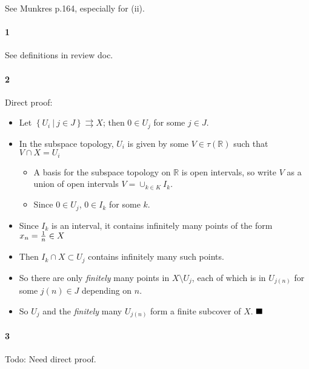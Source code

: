 \begin{solution}

\hfill

\begin{concept}

\hfill

See Munkres p.164, especially for (ii).

\end{concept}

\hypertarget{section-3}{%
\paragraph{1}\label{section-3}}

See definitions in review doc.

\hypertarget{section-4}{%
\paragraph{2}\label{section-4}}

Direct proof:

\begin{itemize}
\tightlist
\item
  Let
  \(\left\{{U_i {~\mathrel{\Big|}~}j\in J}\right\}\rightrightarrows X\);
  then \(0\in U_j\) for some \(j\in J\).
\item
  In the subspace topology, \(U_i\) is given by some
  \(V\in \tau({\mathbb{R}})\) such that \(V\cap X = U_i\)

  \begin{itemize}
  \tightlist
  \item
    A basis for the subspace topology on \({\mathbb{R}}\) is open
    intervals, so write \(V\) as a union of open intervals
    \(V = \cup_{k\in K} I_k\).
  \item
    Since \(0\in U_j\), \(0\in I_k\) for some \(k\).
  \end{itemize}
\item
  Since \(I_k\) is an interval, it contains infinitely many points of
  the form \(x_n = {1 \over n} \in X\)
\item
  Then \(I_k \cap X \subset U_j\) contains infinitely many such points.
\item
  So there are only \emph{finitely} many points in \(X\setminus U_j\),
  each of which is in \(U_{j(n)}\) for some \(j(n) \in J\) depending on
  \(n\).
\item
  So \(U_j\) and the \emph{finitely} many \(U_{j(n)}\) form a finite
  subcover of \(X\). \(\hfill\blacksquare\)
\end{itemize}

\hypertarget{section-5}{%
\paragraph{3}\label{section-5}}

Todo: Need direct proof.

\end{solution}

